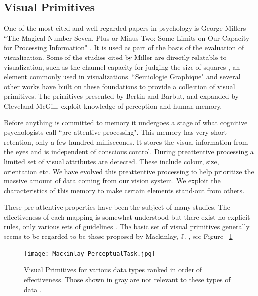\documentclass[a4paper, 10pt, titlepage, twocolumn]{article}
\begin{document}
\subsection{Visual Primitives}
One of the most cited and well regarded papers in psychology is George Millers ``The Magical Number Seven, Plus or Minus Two: Some Limits on Our Capacity for Processing Information" \cite{Mil56}. It is used as part of the basis of the evaluation of visualization. Some of the studies cited by Miller are directly relatable to visualization, such as the channel capacity for judging the size of squares \cite{eriksen1955absolute}, an element commonly used in visualizations. ``Semiologie Graphique" \cite{bertin1973semiologie} and several other works have built on these foundations to provide a collection of visual primitives. The primitives presented by Bertin and Barbut, and expanded by Cleveland McGill, exploit knowledge of perception and human memory. 

Before anything is committed to memory it undergoes a stage of what cognitive psychologists call ``pre-attentive processing". This memory has very short retention, only a few hundred milliseconds. It stores the visual information from the eyes and is independent of conscious control. During preattentive processing a limited set of visual attributes are detected. These include colour, size, orientation etc. We have evolved this preattentive processing to help prioritize the massive amount of data coming from our vision system. We exploit the characteristics of this memory to make certain elements stand-out from others.

These pre-attentive properties have been the subject of many studies. The effectiveness of each mapping is somewhat understood but there exist no explicit rules, only various sets of guidelines \cite{few2004show}. The basic set of visual primitives generally seems to be regarded to be those proposed by Mackinlay, J. \cite{mackinlay1986automating}, see Figure ~\ref{fig:jock}


\begin{figure}[hbt]
  \begin{center}
    \texttt{[image: Mackinlay\_PerceptualTask.jpg]}
  \end{center}
  \caption{\small Visual Primitives for various data types ranked in order of effectiveness. Those shown in gray are not relevant to these types of data \cite{mackinlay1986automating}.}
  \label{fig:jock}
\end{figure}
\end{document}
